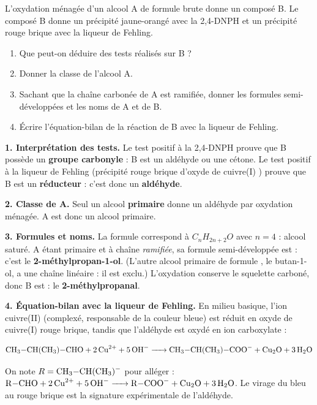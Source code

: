 \documentclass[11pt]{article}
\begin{document}
\begin{exoresolu}
L'oxydation ménagée d'un alcool A de formule brute  donne un composé B. Le composé B donne un précipité jaune-orangé avec la 2,4-DNPH et un précipité rouge brique avec la liqueur de Fehling.
\begin{enumerate}
\item Que peut-on déduire des tests réalisés sur B ?
\item Donner la classe de l'alcool A.
\item Sachant que la chaîne carbonée de A est ramifiée, donner les formules semi-développées et les noms de A et de B.
\item Écrire l'équation-bilan de la réaction de B avec la liqueur de Fehling.
\end{enumerate}
\tcblower
\textbf{1. Interprétation des tests.} Le test positif à la 2,4-DNPH prouve que B possède un \textbf{groupe carbonyle} : B est un aldéhyde ou une cétone. Le test positif à la liqueur de Fehling (précipité rouge brique d'oxyde de cuivre(I) ) prouve que B est un \textbf{réducteur} : c'est donc un \textbf{aldéhyde}.

\textbf{2. Classe de A.} Seul un alcool \textbf{primaire} donne un aldéhyde par oxydation ménagée. A est donc un alcool primaire.

\textbf{3. Formules et noms.} La formule  correspond à $C_nH_{2n+2}O$ avec $n = 4$ : alcool saturé. A étant primaire et à chaîne \emph{ramifiée}, sa formule semi-développée est  : c'est le \textbf{2-méthylpropan-1-ol}. (L'autre alcool primaire de formule , le butan-1-ol, a une chaîne linéaire : il est exclu.) L'oxydation conserve le squelette carboné, donc B est  : le \textbf{2-méthylpropanal}.

\textbf{4. Équation-bilan avec la liqueur de Fehling.} En milieu basique, l'ion cuivre(II)  (complexé, responsable de la couleur bleue) est réduit en oxyde de cuivre(I)  rouge brique, tandis que l'aldéhyde est oxydé en ion carboxylate :

\[ \ce{CH3-CH(CH3)-CHO + 2 Cu^2+ + 5 OH- -> CH3-CH(CH3)-COO- + Cu2O + 3 H2O} \]

On note $R = \ce{CH3-CH(CH3)-}$ pour alléger : $\ce{R-CHO + 2 Cu^2+ + 5 OH- -> R-COO- + Cu2O + 3 H2O}$. Le virage du bleu au rouge brique est la signature expérimentale de l'aldéhyde.
\end{exoresolu}
\end{document}
